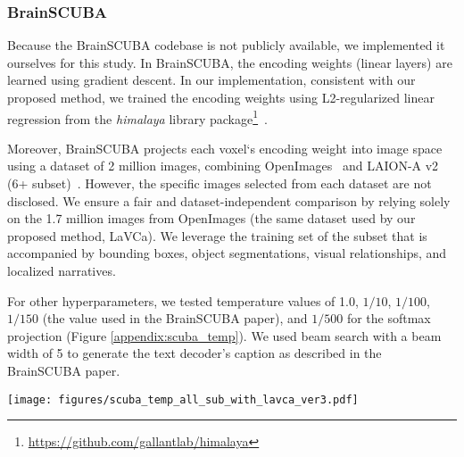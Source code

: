 \subsubsection{BrainSCUBA}
\label{appendix:brainscuba}
Because the BrainSCUBA codebase is not publicly available, we implemented it ourselves for this study. In BrainSCUBA, the encoding weights (linear layers) are learned using gradient descent. In our implementation, consistent with our proposed method, we trained the encoding weights using L2-regularized linear regression from the \textit{himalaya} library package\footnote{\href{https://github.com/gallantlab/himalaya}{https://github.com/gallantlab/himalaya}}~\cite{la2022feature}.

Moreover, BrainSCUBA projects each voxel‘s encoding weight into image space using a dataset of 2 million images, combining OpenImages~\cite{OpenImages} and LAION-A v2 (6+ subset)~\cite{schuhmann2022laion}. However, the specific images selected from each dataset are not disclosed. We ensure a fair and dataset-independent comparison by relying solely on the 1.7 million images from OpenImages (the same dataset used by our proposed method, LaVCa). We leverage the training set of the subset that is accompanied by bounding boxes, object segmentations, visual relationships, and localized narratives.

For other hyperparameters, we tested temperature values of 1.0, $1/10$, $1/100$, $1/150$ (the value used in the BrainSCUBA paper), and $1/500$ for the softmax projection (Figure \ref{appendix:scuba_temp}). We used beam search with a beam width of 5 to generate the text decoder’s caption as described in the BrainSCUBA paper.


\begin{figure*}[t] %
  \centering
  \texttt{[image: figures/scuba\_temp\_all\_sub\_with\_lavca\_ver3.pdf]}
  \caption{The change in accuracy of BrainSCUBA with respect to temperature. The error bars represent standard error. Moreover, the star markers on the plot indicate the point where the temperature is set to 1/150, as adopted in the original BrainSCUBA paper. The green line represents the average value of LaVCa.
}
  \label{appendix:scuba_temp}
\end{figure*}


\clearpage
